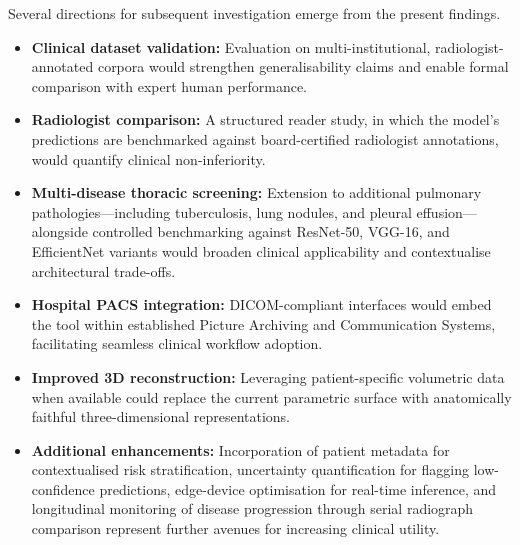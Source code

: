 \documentclass[conference]{IEEEtran}
\begin{document}
Several directions for subsequent investigation emerge from the present findings.

\begin{itemize}
    \item \textbf{Clinical dataset validation:} Evaluation on multi-institutional, radiologist-annotated corpora would strengthen generalisability claims and enable formal comparison with expert human performance.
    \item \textbf{Radiologist comparison:} A structured reader study, in which the model's predictions are benchmarked against board-certified radiologist annotations, would quantify clinical non-inferiority.
    \item \textbf{Multi-disease thoracic screening:} Extension to additional pulmonary pathologies---including tuberculosis, lung nodules, and pleural effusion---alongside controlled benchmarking against ResNet-50, VGG-16, and EfficientNet variants would broaden clinical applicability and contextualise architectural trade-offs.
    \item \textbf{Hospital PACS integration:} DICOM-compliant interfaces would embed the tool within established Picture Archiving and Communication Systems, facilitating seamless clinical workflow adoption.
    \item \textbf{Improved 3D reconstruction:} Leveraging patient-specific volumetric data when available could replace the current parametric surface with anatomically faithful three-dimensional representations.
    \item \textbf{Additional enhancements:} Incorporation of patient metadata for contextualised risk stratification, uncertainty quantification for flagging low-confidence predictions, edge-device optimisation for real-time inference, and longitudinal monitoring of disease progression through serial radiograph comparison represent further avenues for increasing clinical utility.
\end{itemize}
\end{document}
